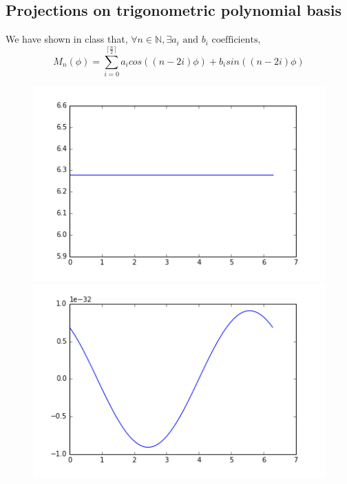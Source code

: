 \documentclass[a4,12pt]{article}
\begin{document}
\subsection{Projections on trigonometric polynomial basis}
We have shown in class that, $\forall n \in \mathbb{N}, \exists {a_i} \text{ and } {b_i} \text{ coefficients,}         $
\[
	M_{n}(\phi) = \displaystyle \sum_{i=0}^{\lceil \frac{n}{2} \rceil}a_{i}cos((n-2i)\phi) + b_{i}sin((n-2i)\phi)
\]
\begin{figure}[h!]
   \begin{minipage}[c]{.46\linewidth}
      \includegraphics[scale=0.5]{../images/moments/unitDiskProjMoment0.png} 
   \end{minipage} \hfill
   \begin{minipage}[c]{.46\linewidth}
      \includegraphics[scale=0.5]{../images/moments/unitDiskProjMoment1.png}  
   \end{minipage}
\end{figure}
\end{document}
